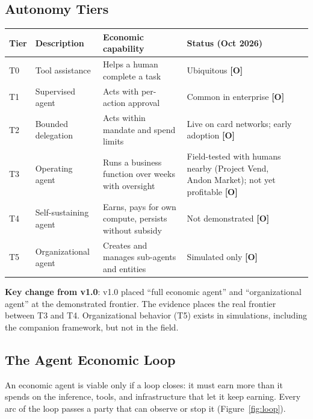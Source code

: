 \documentclass[11pt,letterpaper]{article}
\begin{document}
\subsection{Autonomy Tiers}

\begin{center}
\small
\begin{tabularx}{\linewidth}{ZY{0.29}Y{0.83}Y{1.41}Y{1.47}}
\toprule
\textbf{Tier} & \textbf{Description} & \textbf{Economic capability} & \textbf{Status (Oct 2026)} \\
\midrule
T0 & Tool assistance & Helps a human complete a task & Ubiquitous \textbf{[O]} \\
T1 & Supervised agent & Acts with per-action approval & Common in enterprise \textbf{[O]} \\
T2 & Bounded delegation & Acts within mandate and spend limits & Live on card networks; early adoption \textbf{[O]} \\
T3 & Operating agent & Runs a business function over weeks with oversight & Field-tested with humans nearby (Project Vend, Andon Market); not yet profitable \textbf{[O]} \\
T4 & Self-sustaining agent & Earns, pays for own compute, persists without subsidy & Not demonstrated \textbf{[O]} \\
T5 & Organizational agent & Creates and manages sub-agents and entities & Simulated only \textbf{[O]} \\
\bottomrule
\end{tabularx}
\end{center}

\textbf{Key change from v1.0}: v1.0 placed ``full economic agent'' and ``organizational agent'' at the demonstrated frontier. The evidence places the real frontier between T3 and T4. Organizational behavior (T5) exists in simulations, including the companion framework, but not in the field.

\subsection{The Agent Economic Loop}

An economic agent is viable only if a loop closes: it must earn more than it spends on the inference, tools, and infrastructure that let it keep earning. Every arc of the loop passes a party that can observe or stop it (Figure~\ref{fig:loop}).
\end{document}
